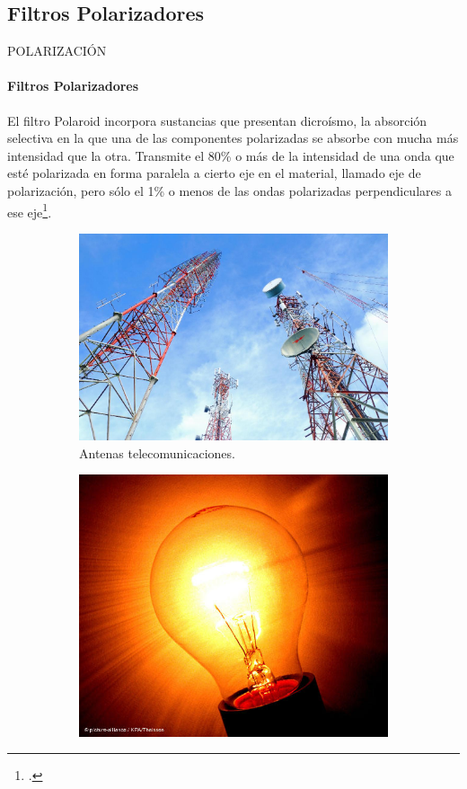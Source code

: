 \subsection{Filtros Polarizadores}
\begin{frame}{POLARIZACIÓN}
    \framesubtitle{Filtros Polarizadores}
    El filtro Polaroid incorpora sustancias que presentan dicroísmo, la absorción selectiva en la que una de las componentes polarizadas se absorbe con mucha más intensidad que la otra. Transmite el 80\% o más de la intensidad de una onda que esté polarizada en forma paralela a cierto eje en el material, llamado eje de polarización, pero sólo el 1\% o menos de las ondas polarizadas perpendiculares a ese eje\footnote{.}.

        \begin{figure}
        	\centering
        	\begin{subfigure}[H]{0.4\textwidth}
                \includegraphics[width=\linewidth]{mari/Antenas.jpg}
                \caption{Antenas telecomunicaciones\footnotemark{}.}
        	\end{subfigure}
            \hspace{2mm}
            \begin{subfigure}[H]{0.32\textwidth}
            	\includegraphics[width=\linewidth]{mari/bombilla.jpg}

\end{subfigure}
\end{figure}
\end{frame}
